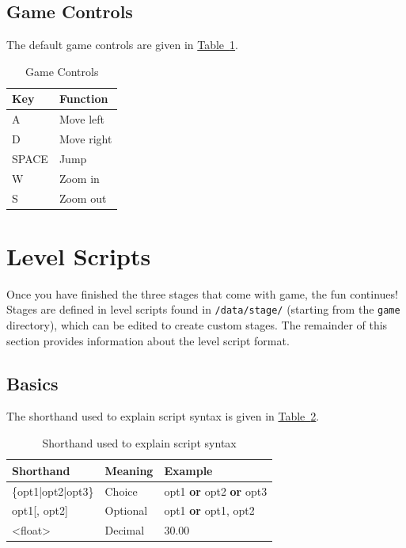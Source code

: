 \documentclass[12pt, titlepage]{article}
\begin{document}
\subsection{Game Controls}
The default game controls are given in \hyperref[tab:ctrl]{Table~\ref*{tab:ctrl}}.


\begin{table}[H]
\caption{Game Controls} \label{tab:ctrl}
\centering
\begin{tabularx}{0.65\textwidth}{p{2.5cm}X}
\toprule {\bf Key} & {\bf Function}\\
\midrule
A & Move left\\
D & Move right\\
SPACE & Jump\\
W & Zoom in\\
S & Zoom out\\
\bottomrule
\end{tabularx}
\end{table}

\FloatBarrier

\section{Level Scripts}
\label{sec:edit}
Once you have finished the three stages that come with game, the fun continues!  Stages are defined in level scripts found in \texttt{/data/stage/} (starting from the \texttt{game} directory), which can be edited to create custom stages.  The remainder of this section provides information about the level script format.

\subsection{Basics}
The shorthand used to explain script syntax is given in \hyperref[tab:notation]{Table~\ref*{tab:notation}}.

\begin{table}[h]
\caption{Shorthand used to explain script syntax} \label{tab:notation}
\centering
\begin{tabularx}{\textwidth}{p{3cm}p{3cm}X}
\toprule {\bf Shorthand} & {\bf Meaning} & {\bf Example}\\
\midrule
\{opt1|opt2|opt3\} & Choice & opt1 {\bf or} opt2 {\bf or} opt3\\
opt1[, opt2] & Optional & opt1 {\bf or} opt1, opt2\\
<float> & Decimal & 30.00\\
\bottomrule
\end{tabularx}
\end{table}
\end{document}
